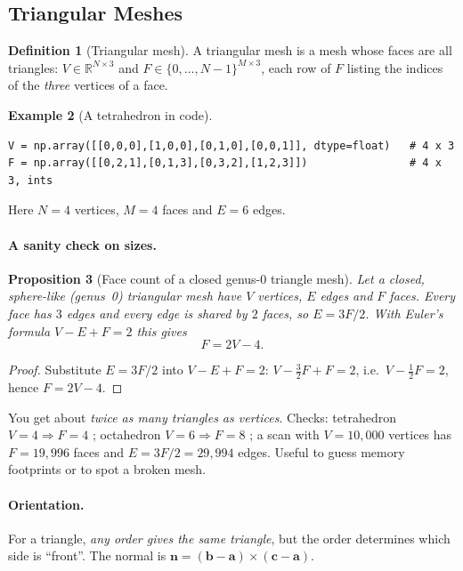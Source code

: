 \documentclass[11pt,a4paper]{article}
\newcommand{\R}{\mathbb{R}}
\newcommand{\vn}{\bm{n}}
\newcommand{\va}{\bm{a}}
\newcommand{\vb}{\bm{b}}
\newcommand{\vc}{\bm{c}}
\theoremstyle{definition}
\newtheorem{definition}{Definition}[section]
\newtheorem{example}[definition]{Example}
\theoremstyle{plain}
\newtheorem{proposition}[definition]{Proposition}
\theoremstyle{remark}
\begin{document}
\subsection{Triangular Meshes }
\begin{definition}[Triangular mesh]
A triangular mesh is a mesh whose faces are all triangles: $V\in\R^{N\times 3}$ and $F\in\{0,\dots,N-1\}^{M\times 3}$, each row of $F$ listing the indices of the \emph{three} vertices of a face.
\end{definition}

\begin{example}[A tetrahedron in code]
\begin{lstlisting}
V = np.array([[0,0,0],[1,0,0],[0,1,0],[0,0,1]], dtype=float)   # 4 x 3
F = np.array([[0,2,1],[0,1,3],[0,3,2],[1,2,3]])                # 4 x 3, ints
\end{lstlisting}
Here $N=4$ vertices, $M=4$ faces and $E=6$ edges.
\end{example}

\paragraph{A sanity check on sizes.}
\begin{proposition}[Face count of a closed genus-0 triangle mesh]\label{prop:euler}
Let a closed, sphere-like (genus~0) triangular mesh have $V$ vertices, $E$ edges and $F$ faces. Every face has $3$ edges and every edge is shared by $2$ faces, so $E=3F/2$. With Euler's formula $V-E+F=2$ this gives
\[
F=2V-4 .
\]
\end{proposition}
\begin{proof}
Substitute $E=3F/2$ into $V-E+F=2$: $V-\tfrac32F+F=2$, i.e.\ $V-\tfrac12F=2$, hence $F=2V-4$.
\end{proof}

\begin{intuition}
You get about \emph{twice as many triangles as vertices}. Checks: tetrahedron $V=4\Rightarrow F=4$ \checkmark; octahedron $V=6\Rightarrow F=8$ \checkmark; a scan with $V=10{,}000$ vertices has $F=19{,}996$ faces and $E=3F/2=29{,}994$ edges. Useful to guess memory footprints or to spot a broken mesh.
\end{intuition}

\paragraph{Orientation.} For a triangle, \emph{any order gives the same triangle}, but the order determines which side is ``front''. The normal is $\vn=(\vb-\va)\times(\vc-\va)$.
\end{document}
